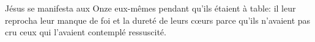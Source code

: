 \encetemps
	Jésus se manifesta aux Onze eux-mêmes pendant qu’ils étaient à table:
	il leur reprocha leur manque de foi et la dureté de leurs cœurs
	parce qu’ils n’avaient pas cru ceux qui l’avaient contemplé ressuscité.
